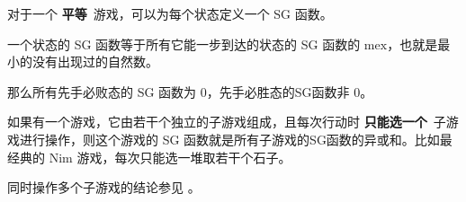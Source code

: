 对于一个 \textbf{平等}\ 游戏，可以为每个状态定义一个 SG 函数。

一个状态的 SG 函数等于所有它能一步到达的状态的 SG 函数的 $\text{mex}$，也就是最小的没有出现过的自然数。

那么所有先手必败态的 SG 函数为 $0$，先手必胜态的SG函数非 $0$。

如果有一个游戏，它由若干个独立的子游戏组成，且每次行动时 \textbf{只能选一个}\ 子游戏进行操作，则这个游戏的 SG 函数就是所有子游戏的SG函数的异或和。比如最经典的 Nim 游戏，每次只能选一堆取若干个石子。

同时操作多个子游戏的结论参见 。
